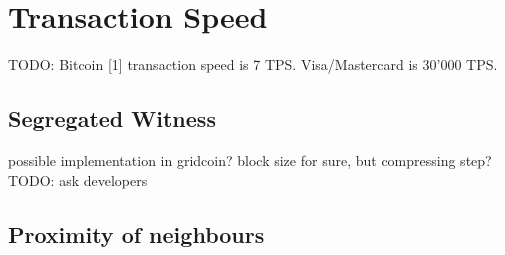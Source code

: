 \section{Transaction Speed}

TODO:
Bitcoin [1] transaction speed is 7 TPS.
Visa/Mastercard is 30'000 TPS.

\subsection{Segregated Witness}
possible implementation in gridcoin? 
block size for sure, but compressing step?
TODO: ask developers

\subsection{Proximity of neighbours}

